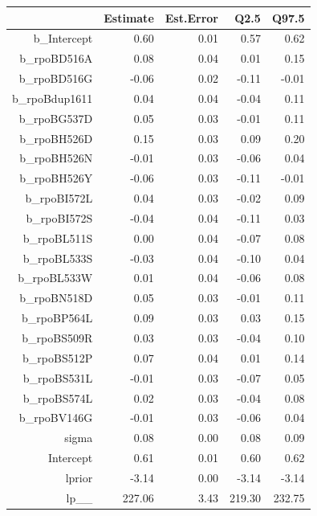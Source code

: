 \begin{table}[ht]
\centering
\begin{tabular}{rrrrr}
  \hline
 & Estimate & Est.Error & Q2.5 & Q97.5 \\ 
  \hline
b\_Intercept & 0.60 & 0.01 & 0.57 & 0.62 \\ 
  b\_rpoBD516A & 0.08 & 0.04 & 0.01 & 0.15 \\ 
  b\_rpoBD516G & -0.06 & 0.02 & -0.11 & -0.01 \\ 
  b\_rpoBdup1611 & 0.04 & 0.04 & -0.04 & 0.11 \\ 
  b\_rpoBG537D & 0.05 & 0.03 & -0.01 & 0.11 \\ 
  b\_rpoBH526D & 0.15 & 0.03 & 0.09 & 0.20 \\ 
  b\_rpoBH526N & -0.01 & 0.03 & -0.06 & 0.04 \\ 
  b\_rpoBH526Y & -0.06 & 0.03 & -0.11 & -0.01 \\ 
  b\_rpoBI572L & 0.04 & 0.03 & -0.02 & 0.09 \\ 
  b\_rpoBI572S & -0.04 & 0.04 & -0.11 & 0.03 \\ 
  b\_rpoBL511S & 0.00 & 0.04 & -0.07 & 0.08 \\ 
  b\_rpoBL533S & -0.03 & 0.04 & -0.10 & 0.04 \\ 
  b\_rpoBL533W & 0.01 & 0.04 & -0.06 & 0.08 \\ 
  b\_rpoBN518D & 0.05 & 0.03 & -0.01 & 0.11 \\ 
  b\_rpoBP564L & 0.09 & 0.03 & 0.03 & 0.15 \\ 
  b\_rpoBS509R & 0.03 & 0.03 & -0.04 & 0.10 \\ 
  b\_rpoBS512P & 0.07 & 0.04 & 0.01 & 0.14 \\ 
  b\_rpoBS531L & -0.01 & 0.03 & -0.07 & 0.05 \\ 
  b\_rpoBS574L & 0.02 & 0.03 & -0.04 & 0.08 \\ 
  b\_rpoBV146G & -0.01 & 0.03 & -0.06 & 0.04 \\ 
  sigma & 0.08 & 0.00 & 0.08 & 0.09 \\ 
  Intercept & 0.61 & 0.01 & 0.60 & 0.62 \\ 
  lprior & -3.14 & 0.00 & -3.14 & -3.14 \\ 
  lp\_\_ & 227.06 & 3.43 & 219.30 & 232.75 \\ 
   \hline
\end{tabular}
\end{table}
